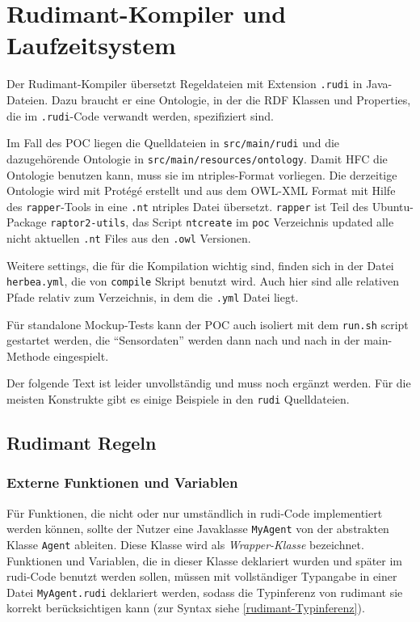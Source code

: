 \newcommand{\caret}{{\large\textbf{\textasciicircum}}}

\section{Rudimant-Kompiler und Laufzeitsystem}

Der Rudimant-Kompiler übersetzt Regeldateien mit Extension \texttt{.rudi} in
Java-Dateien. Dazu braucht er eine Ontologie, in der die RDF Klassen und
Properties, die im \texttt{.rudi}-Code verwandt werden, spezifiziert sind.

Im Fall des POC liegen die Quelldateien in \texttt{src/main/rudi} und die
dazugehörende Ontologie in \texttt{src/main/resources/ontology}. Damit HFC
die Ontologie benutzen kann, muss sie im ntriples-Format vorliegen. Die
derzeitige Ontologie wird mit Protégé erstellt und aus dem OWL-XML Format
mit Hilfe des \texttt{rapper}-Tools in eine \texttt{.nt} ntriples Datei
übersetzt. \texttt{rapper} ist Teil des Ubuntu-Package \texttt{raptor2-utils},
das Script \texttt{ntcreate} im \texttt{poc} Verzeichnis updated alle nicht
aktuellen \texttt{.nt} Files aus den \texttt{.owl} Versionen.

Weitere settings, die für die Kompilation wichtig sind, finden sich in der
Datei \texttt{herbea.yml}, die von \texttt{compile} Skript benutzt wird. Auch
hier sind alle relativen Pfade relativ zum Verzeichnis, in dem die
\texttt{.yml} Datei liegt.

Für standalone Mockup-Tests kann der POC auch isoliert mit dem \texttt{run.sh}
script gestartet werden, die ``Sensordaten'' werden dann nach und nach in
der main-Methode eingespielt.

Der folgende Text ist leider unvollständig und muss noch ergänzt werden. Für
die meisten Konstrukte gibt es einige Beispiele in den \texttt{rudi}
Quelldateien.

\subsection{Rudimant Regeln}


\subsubsection{Externe Funktionen und Variablen}
\label{rudimant-global}

Für Funktionen, die nicht oder nur umständlich in rudi-Code implementiert
werden können, sollte der Nutzer eine Javaklasse \texttt{MyAgent} von der
abstrakten Klasse \texttt{Agent} ableiten. Diese Klasse wird als
\emph{Wrapper-Klasse} bezeichnet. Funktionen und Variablen, die in
dieser Klasse deklariert wurden und später im rudi-Code benutzt werden sollen,
müssen mit vollständiger Typangabe in einer Datei \texttt{MyAgent.rudi}
deklariert werden, sodass die Typinferenz von rudimant sie korrekt
berücksichtigen kann (zur Syntax siehe \ref{rudimant-Typinferenz}).

